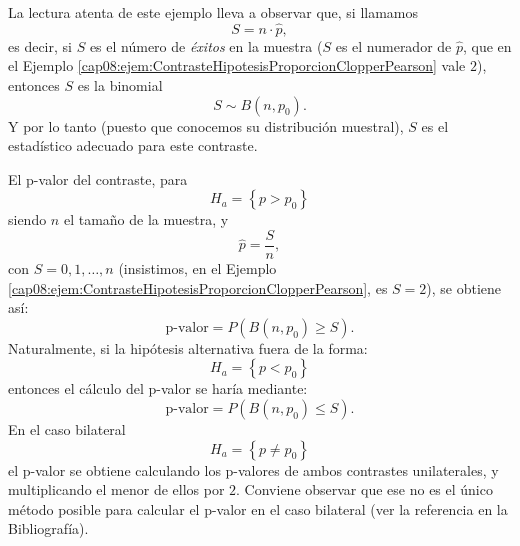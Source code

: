 La lectura atenta de este ejemplo lleva a observar que, si llamamos
    \begin{equation}\label{cap08:ecu:EstadisticoContrasteClopperPearson}
        S=n\cdot \hat p,
    \end{equation}
es decir, si $S$ es el número de {\em éxitos} en la muestra ($S$ es el numerador de $\hat p$, que en el Ejemplo \ref{cap08:ejem:ContrasteHipotesisProporcionClopperPearson} vale $2$), entonces $S$ es la binomial
    \[S\sim B(n,p_0).\]
Y por lo tanto (puesto que conocemos su distribución muestral), $S$ es el estadístico adecuado para este contraste.

El p-valor del contraste, para
      \begin{equation}\label{cap08:ecu:HaColaDerechaClopperPearson}
        H_a=\left\{p>p_0\right\}
      \end{equation}
siendo $n$ el tamaño de la muestra, y
      \[\hat p=\dfrac{S}{n},\]
con $S=0,1,\ldots,n$ (insistimos, en el Ejemplo \ref{cap08:ejem:ContrasteHipotesisProporcionClopperPearson}, es $S=2$), se obtiene así:
      \begin{equation}\label{cap08:ecu:pValorProporcionClopperPearsonColaDerecha}
          \mbox{p-valor}= P\left( B(n,p_0) \geq S \right).
      \end{equation}
Naturalmente, si la hipótesis alternativa fuera de la forma:
      \begin{equation}\label{cap08:ecu:HaColaIzdaClopperPearson}
        H_a=\left\{p<p_0\right\}
      \end{equation}
entonces el cálculo del p-valor se haría mediante:
      \begin{equation}\label{cap08:ecu:pValorProporcionClopperPearsonColaIzquierda}
          \mbox{p-valor}= P\left( B(n,p_0) \leq S \right).
      \end{equation}
En el caso bilateral
      \begin{equation}\label{cap08:ecu:HaBilateralClopperPearson}
        H_a=\left\{p\neq p_0\right\}
      \end{equation}
el p-valor se obtiene calculando los p-valores de ambos contrastes unilaterales, y multiplicando el
menor de ellos por $2$.
Conviene observar que ese no es el único método posible para calcular el p-valor en el caso bilateral (ver la referencia \cite{fay2010two} en la Bibliografía).

